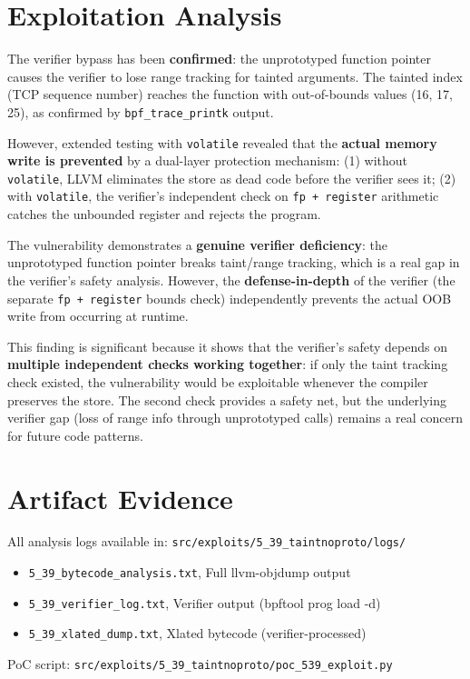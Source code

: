 \section{Exploitation Analysis}
\noindent
The verifier bypass has been \textbf{confirmed}: the unprototyped function pointer causes the verifier to lose range tracking for tainted arguments. The tainted index (TCP sequence number) reaches the function with out-of-bounds values (16, 17, 25), as confirmed by \texttt{bpf\_trace\_printk} output.

\vspace{0.2cm}
\noindent
However, extended testing with \texttt{volatile} revealed that the \textbf{actual memory write is prevented} by a dual-layer protection mechanism: (1) without \texttt{volatile}, LLVM eliminates the store as dead code before the verifier sees it; (2) with \texttt{volatile}, the verifier's independent check on \texttt{fp + register} arithmetic catches the unbounded register and rejects the program.

\vspace{0.2cm}
\noindent
The vulnerability demonstrates a \textbf{genuine verifier deficiency}: the unprototyped function pointer breaks taint/range tracking, which is a real gap in the verifier's safety analysis. However, the \textbf{defense-in-depth} of the verifier (the separate \texttt{fp + register} bounds check) independently prevents the actual OOB write from occurring at runtime.

\vspace{0.2cm}
\noindent
This finding is significant because it shows that the verifier's safety depends on \textbf{multiple independent checks working together}: if only the taint tracking check existed, the vulnerability would be exploitable whenever the compiler preserves the store. The second check provides a safety net, but the underlying verifier gap (loss of range info through unprototyped calls) remains a real concern for future code patterns.

\section{Artifact Evidence}

All analysis logs available in: \texttt{src/exploits/5\_39\_taintnoproto/logs/}

\begin{itemize}
  \item \texttt{5\_39\_bytecode\_analysis.txt}, Full llvm-objdump output
  \item \texttt{5\_39\_verifier\_log.txt}, Verifier output (bpftool prog load -d)
  \item \texttt{5\_39\_xlated\_dump.txt}, Xlated bytecode (verifier-processed)
\end{itemize}

\noindent
PoC script: \texttt{src/exploits/5\_39\_taintnoproto/poc\_539\_exploit.py}

